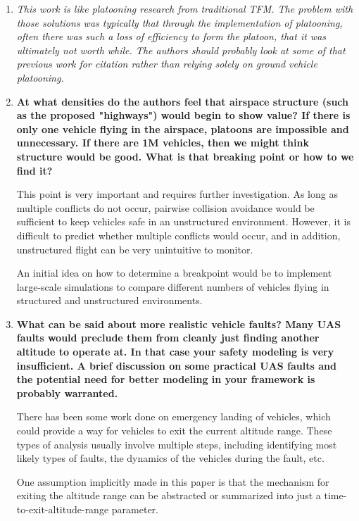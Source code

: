 \documentclass[submit]{aiaa-pretty}
\begin{document}
\begin{enumerate}
\item\textit{This work is like platooning research from traditional TFM.  The problem with those solutions was typically that through the implementation of platooning, often there was such a loss of efficiency to form the platoon, that it was ultimately not worth while.  The authors should probably look at some of that previous work for citation rather than relying solely on ground vehicle platooning.}

\item\textbf{At what densities do the authors feel that airspace structure (such as the proposed "highways") would begin to show value?  If there is only one vehicle flying in the airspace, platoons are impossible and unnecessary.  If there are 1M vehicles, then we might think structure would be good.  What is that breaking point or how to we find it?}

This point is very important and requires further investigation. As long as multiple conflicts do not occur, pairwise collision avoidance would be sufficient to keep vehicles safe in an unstructured environment. However, it is difficult to predict whether multiple conflicts would occur, and in addition, unstructured flight can be very unintuitive to monitor. 

An initial idea on how to determine a breakpoint would be to implement large-scale simulations to compare different numbers of vehicles flying in structured and unstructured environments.

\item\textbf{What can be said about more realistic vehicle faults?  Many UAS faults would preclude them from cleanly just finding another altitude to operate at.  In that case your safety modeling is very insufficient.  A brief discussion on some practical UAS faults and the potential need for better modeling in your framework is probably warranted.}

There has been some work done on emergency landing of vehicles, which could provide a way for vehicles to exit the current altitude range. These types of analysis usually involve multiple steps, including identifying most likely types of faults, the dynamics of the vehicles during the fault, etc. 

One assumption implicitly made in this paper is that the mechanism for exiting the altitude range can be abstracted or summarized into just a time-to-exit-altitude-range parameter.


\end{enumerate}
\end{document}
